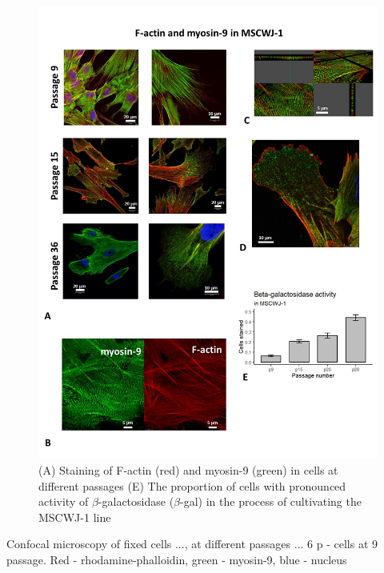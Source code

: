 \documentclass[english,authoryear]{elsarticle}
\begin{document}
\begin{figure}[hbt!]
  \label{m9-actin-bgal}
\centering
\includegraphics[width=0.9\linewidth]{fig_m9-actin-bgal.jpg}
\caption{(A) Staining of F-actin (red) and myosin-9 (green) in cells at different passages (E) The proportion of cells with pronounced activity of $\beta$-galactosidase ($\beta$-gal) in the process of cultivating the MSCWJ-1 line}
\end{figure}


Confocal microscopy of fixed cells ..., at different passages ... 6 p - cells at 9 passage. Red - rhodamine-phalloidin, green - myosin-9, blue - nucleus
\end{document}
